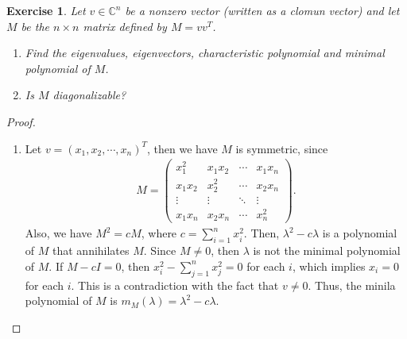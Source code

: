 \documentclass[11pt]{article}
\newtheorem{exercise}{Exercise}[section]
\theoremstyle{definition}
\numberwithin{equation}{subsection}
\begin{document}
\medskip

\begin{exercise}{\rm *}
Let $v \in \mathbb{C}^n$ be a nonzero vector (written as a clomun vector) and let $M$ be the $n \times n$ matrix defined by $M = v v^T$.
\begin{enumerate}[label=(\alph*)]
    \item Find the eigenvalues, eigenvectors, characteristic polynomial and minimal polynomial of $M$. 
    
    \item Is $M$ diagonalizable?
\end{enumerate}
\end{exercise}
\begin{proof}
~\begin{enumerate}[label=(\alph*)]
    \item Let $v = (x_1, x_2, \cdots, x_n)^T$, then we have $M$ is symmetric, since
    \begin{align*}
        M = \begin{pmatrix}
            x_1^2 & x_1x_2 & \cdots & x_1x_n \\
            x_1x_2 & x_2^2 & \cdots & x_2x_n \\
            \vdots & \vdots & \ddots & \vdots \\
            x_1x_n & x_2x_n & \cdots & x_n^2
        \end{pmatrix}.
    \end{align*}
    Also, we have $M^2 = cM$, where $c = \sum^n_{i=1} x_i^2$. Then, $\lambda^2 - c\lambda$ is a polynomial of $M$ that annihilates $M$. Since $M \neq 0$, then $\lambda$ is not the minimal polynomial of $M$. If $M - cI = 0$, then $x_i^2 - \sum^n_{j=1}x_j^2 = 0$ for each $i$, which implies $x_i = 0$ for each $i$. This is a contradiction with the fact that $v \neq 0$. Thus, the minila polynomial of $M$ is $m_M(\lambda) = \lambda^2 - c \lambda$.
    

\end{enumerate}
\end{proof}
\end{document}
